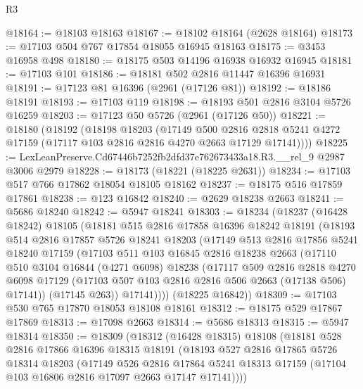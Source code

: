 \begin{lexlean}{R3}
\begin{coremodule}
@18164 := @18103 @18163
@18167 := @18102 @18164 (@2628 @18164)
@18173 := @17103 @504 @767 @17854 @18055 @16945 @18163
@18175 := @3453 @16958 @498
@18180 := @18175 @503 @14196 @16938 @16932 @16945
@18181 := @17103 @101
@18186 := @18181 @502 @2816 @11447 @16396 @16931
@18191 := @17123 @81 @16396 (@2961 (@17126 @81))
@18192 := @18186 @18191
@18193 := @17103 @119
@18198 := @18193 @501 @2816 @3104 @5726 @16259
@18203 := @17123 @50 @5726 (@2961 (@17126 @50))
@18221 := @18180
    (@18192
      (@18198
        @18203
        (@17149
          @500
          @2816
          @2818
          @5241
          @4272
          @17159
          (@17117 @103 @2816 @2816 @4270 @2663 @17129 @17141))))
@18225 := LexLeanPreserve.Cd67446b7252fb2dfd37e762673433a18.R3.__rel_9 @2987 @3006 @2979
@18228 := @18173 (@18221 (@18225 @2631))
@18234 := @17103 @517 @766 @17862 @18054 @18105 @18162
@18237 := @18175 @516 @17859 @17861
@18238 := @123 @16842
@18240 := @2629 @18238 @2663
@18241 := @5686 @18240
@18242 := @5947 @18241
@18303 := @18234
    (@18237
      (@16428 @18242)
      @18105
      (@18181
        @515
        @2816
        @17858
        @16396
        @18242
        @18191
        (@18193
          @514
          @2816
          @17857
          @5726
          @18241
          @18203
          (@17149
            @513
            @2816
            @17856
            @5241
            @18240
            @17159
            (@17103
              @511
              @103
              @16845
              @2816
              @18238
              @2663
              (@17110
                @510
                @3104
                @16844
                (@4271 @6098)
                @18238
                (@17117
                  @509
                  @2816
                  @2818
                  @4270
                  @6098
                  @17129
                  (@17103 @507 @103 @2816 @2816 @506 @2663 (@17138 @506) @17141))
                (@17145 @263))
              @17141))))
      (@18225 @16842))
@18309 := @17103 @530 @765 @17870 @18053 @18108 @18161
@18312 := @18175 @529 @17867 @17869
@18313 := @17098 @2663
@18314 := @5686 @18313
@18315 := @5947 @18314
@18350 := @18309
    (@18312
      (@16428 @18315)
      @18108
      (@18181
        @528
        @2816
        @17866
        @16396
        @18315
        @18191
        (@18193
          @527
          @2816
          @17865
          @5726
          @18314
          @18203
          (@17149
            @526
            @2816
            @17864
            @5241
            @18313
            @17159
            (@17104 @103 @16806 @2816 @17097 @2663 @17147 @17141))))

\end{coremodule}
\end{lexlean}
